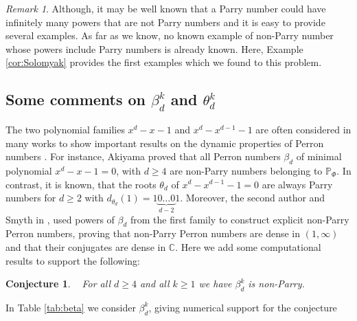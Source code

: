 \documentclass[12pt]{article}
\theoremstyle{plain}
\newtheorem{conj}[theorem]{Conjecture}
\theoremstyle{remark}
\newtheorem{remark}[theorem]{Remark}
\begin{document}
\begin{remark}
 Although, it may be well known that a Parry number could have infinitely many powers that are not Parry numbers and it is easy to provide several examples. As far as we know, no known example of non-Parry number whose powers include Parry numbers is already known. Here, Example \ref{cor:Solomyak} provides the first examples which we found to this problem.
\end{remark}

\subsection[Some comments on powers of beta and theta]{Some comments on $\beta_d^k$ and $\theta_d^k$} \label{sec:beta, theta}

The two polynomial families $x^d - x - 1$ and $x^d - x^{d-1} - 1$ are often considered in many works to show important results on the dynamic properties of Perron numbers \cite{Akiyama2016,HichriSmyth2024,VergerGaugry2008}. For instance, Akiyama proved that all Perron numbers $\beta_d$ of minimal polynomial $x^d - x - 1 = 0$, with $d \ge 4$ are non-Parry numbers belonging to $\mathbb{P}_\Phi$. In contrast, it is known, that the roots $\theta_d$ of $x^d - x^{d-1} - 1 = 0$ are always Parry numbers for $d\geq 2$ with $d_{\theta_d}(1)=1\underbrace{0\dots 0}_{d-2}1$. Moreover, the second author and Smyth in \cite{HichriSmyth2024}, used powers of $\beta_d$ from the first family to construct explicit non-Parry Perron numbers, proving that non-Parry Perron numbers are dense in $(1, \infty)$ and that their conjugates are dense in $\mathbb{C}$. Here we add some computational results to support the following: 
\begin{conj} {\ }
\label{conj:1}
For all $d \geq 4$ and all $k \geq 1$ we have $\beta_d^k$ is non-Parry.
\end{conj}

In Table \ref{tab:beta} we consider $\beta_d^k$, giving numerical support for the conjecture
\end{document}
